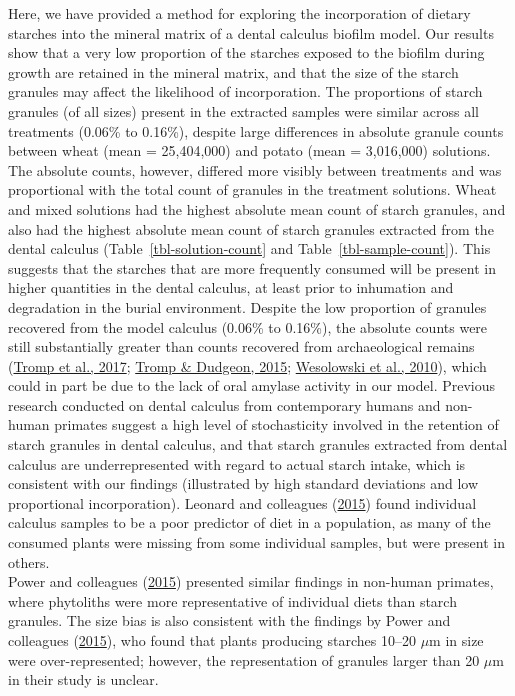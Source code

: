 \documentclass[
  b5paper,
]{book}
\begin{document}
Here, we have provided a method for exploring the incorporation of
dietary starches into the mineral matrix of a dental calculus biofilm
model. Our results show that a very low proportion of the starches
exposed to the biofilm during growth are retained in the mineral matrix,
and that the size of the starch granules may affect the likelihood of
incorporation. The proportions of starch granules (of all sizes) present
in the extracted samples were similar across all treatments (0.06\% to
0.16\%), despite large differences in absolute granule counts between
wheat (mean = 25,404,000) and potato (mean = 3,016,000) solutions.\\
The absolute counts, however, differed more visibly between treatments
and was proportional with the total count of granules in the treatment
solutions. Wheat and mixed solutions had the highest absolute mean count
of starch granules, and also had the highest absolute mean count of
starch granules extracted from the dental calculus
(Table~\ref{tbl-solution-count} and Table~\ref{tbl-sample-count}). This
suggests that the starches that are more frequently consumed will be
present in higher quantities in the dental calculus, at least prior to
inhumation and degradation in the burial environment. Despite the low
proportion of granules recovered from the model calculus (0.06\% to
0.16\%), the absolute counts were still substantially greater than
counts recovered from archaeological remains
(\protect\hyperlink{ref-trompEDTACalculus2017}{Tromp et al., 2017};
\protect\hyperlink{ref-trompDietaryNondietary2015}{Tromp \& Dudgeon,
2015};
\protect\hyperlink{ref-wesolowskiEvaluatingMicrofossil2010}{Wesolowski
et al., 2010}), which could in part be due to the lack of oral amylase
activity in our model. Previous research conducted on dental calculus
from contemporary humans and non-human primates suggest a high level of
stochasticity involved in the retention of starch granules in dental
calculus, and that starch granules extracted from dental calculus are
underrepresented with regard to actual starch intake, which is
consistent with our findings (illustrated by high standard deviations
and low proportional incorporation). Leonard and colleagues
(\protect\hyperlink{ref-leonardPlantMicroremains2015}{2015}) found
individual calculus samples to be a poor predictor of diet in a
population, as many of the consumed plants were missing from some
individual samples, but were present in others.\\
Power and colleagues
(\protect\hyperlink{ref-powerChimpCalculus2015}{2015}) presented similar
findings in non-human primates, where phytoliths were more
representative of individual diets than starch granules. The size bias
is also consistent with the findings by Power and colleagues
(\protect\hyperlink{ref-powerChimpCalculus2015}{2015}), who found that
plants producing starches 10--20 \(\mu\)m in size were over-represented;
however, the representation of granules larger than 20 \(\mu\)m in their
study is unclear.
\end{document}
